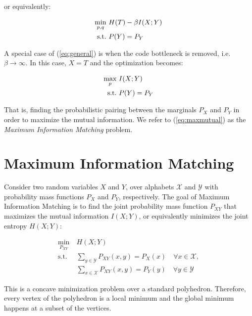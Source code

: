 or equivalently:

\begin{equation} 
\begin{aligned} \label{eq:general}
    \min_{p, q} \ &H(T) - \beta I(X;Y) \\
    \textrm{s.t.} \ &P(Y) = P_Y
\end{aligned}
\end{equation}

A special case of (\ref{eq:general}) is when the code bottleneck is removed, i.e. $\beta \to \infty$. In this case, $X=T$ and the optimization becomes:

\begin{equation} 
\begin{aligned} \label{eq:maxmutual}
    \max_{p} \ &I(X;Y) \\
    \textrm{s.t.} \ &P(Y) = P_Y \\
\end{aligned}
\end{equation}

That is, finding the probabilistic pairing between the marginals $P_X$ and $P_Y$ in order to maximize the mutual information. We refer to (\ref{eq:maxmutual}) as the \textit{Maximum Information Matching} problem.


\section{Maximum Information Matching}

Consider two random variables $X$ and $Y$, over alphabets $\mathcal{X}$ and $\mathcal{Y}$ with probability mass functions $P_X$ and $P_Y$, respectively. The goal of Maximum Information Matching is to find the joint probability mass function $P_{XY}$ that maximizes the mutual information $I(X;Y)$, or equivalently minimizes the joint entropy $H(X;Y)$:

\begin{equation} 
\begin{aligned} \label{eq:minent}
    \min_{P_{XY}} \ &H(X;Y) \\
    \textrm{s.t.} \
        &\sum_{y\in\mathcal{Y}} P_{XY}(x, y) = P_X(x) \quad \forall x\in{\mathcal{X}},  \\
        &\sum_{x\in\mathcal{X}} P_{XY}(x, y) = P_Y(y) \quad \forall y\in{\mathcal{Y}}
\end{aligned}
\end{equation}

This is a concave minimization problem over a standard polyhedron. Therefore, every vertex of the polyhedron is a local minimum and the global minimum happens at a subset of the vertices.

